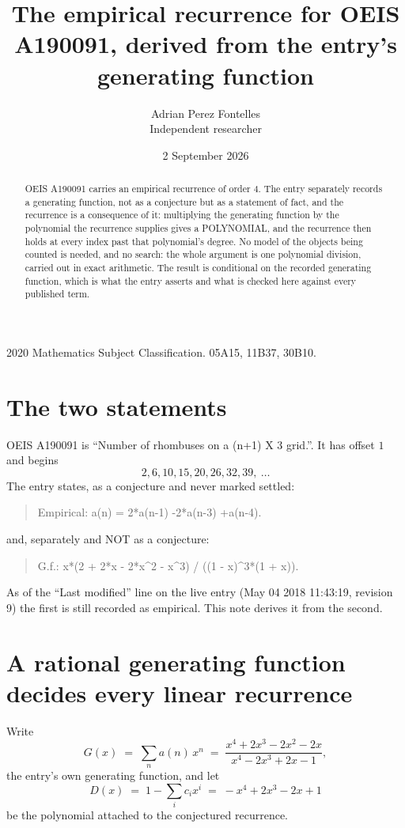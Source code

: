 \documentclass[11pt,a4paper]{article}
\title{The empirical recurrence for OEIS A190091, derived from the entry's generating function}
\author{Adrian Perez Fontelles\\ \small Independent researcher}
\date{2 September 2026}
\theoremstyle{plain}
\theoremstyle{definition}
\begin{document}
\maketitle

\begin{abstract}
OEIS A190091 carries an empirical recurrence of order $4$. The entry separately records a
generating function, not as a conjecture but as a statement of fact, and the recurrence is a
consequence of it: multiplying the generating function by the polynomial the recurrence
supplies gives a POLYNOMIAL, and the recurrence then holds at every index past that
polynomial's degree. No model of the objects being counted is needed, and no search: the
whole argument is one polynomial division, carried out in exact arithmetic. The result is
conditional on the recorded generating function, which is what the entry asserts and what is
checked here against every published term.
\end{abstract}

\noindent\small 2020 Mathematics Subject Classification. 05A15, 11B37, 30B10.\normalsize

\section{The two statements}

OEIS A190091 is ``Number of rhombuses on a (n+1) X 3 grid.''. It has offset $1$ and begins
\[
2, 6, 10, 15, 20, 26, 32, 39,\ \dots
\]
The entry states, as a conjecture and never marked settled:
\begin{quote}
Empirical: a(n) = 2*a(n-1) -2*a(n-3) +a(n-4).
\end{quote}
and, separately and NOT as a conjecture:
\begin{quote}
G.f.: x*(2 + 2*x - 2*x\^{}2 - x\^{}3) / ((1 - x)\^{}3*(1 + x)).
\end{quote}
As of the ``Last modified'' line on the live entry (May 04 2018 11:43:19, revision 9) the first is still
recorded as empirical. This note derives it from the second.

\section{A rational generating function decides every linear recurrence}

Write
\[
G(x)\;=\;\sum_{n}a(n)\,x^{n}\;=\;\frac{x^{4} + 2 x^{3} - 2 x^{2} - 2 x}{x^{4} - 2 x^{3} + 2 x - 1},
\]
the entry's own generating function, and let
\[
D(x)\;=\;1-\sum_i c_i x^{i}\;=\;- x^{4} + 2 x^{3} - 2 x + 1
\]
be the polynomial attached to the conjectured recurrence.
\end{document}
